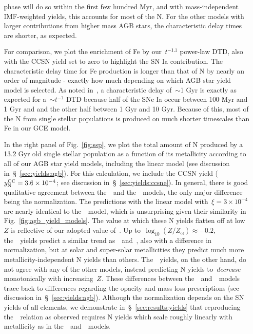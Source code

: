 \documentclass[ms.tex]{subfiles}
\begin{document}
phase will do so within the first few hundred Myr, and with mass-independent
IMF-weighted yields, this accounts for most of the N.
For the other models with larger contributions from higher mass AGB stars, the
characteristic delay times are shorter, as expected.
\par
For comparison, we plot the enrichment of Fe by our~$t^{-1.1}$ power-law DTD,
also with the CCSN yield set to zero to highlight the SN Ia contribution.
The characteristic delay time for Fe production is longer than that of N by
nearly an order of magnitude - exactly how much depending on which AGB star
yield model is selected.
As noted in~\citet{Johnson2021}, a characteristic delay of~$\sim$1 Gyr is
exactly as expected for a~$\sim t^{-1}$ DTD because half of the SNe Ia occur
between 100 Myr and 1 Gyr and and the other half between 1 Gyr and 10 Gyr.
Because of this, most of the N from single stellar populations is produced on
much shorter timescales than Fe in our GCE model.
\par
In the right panel of Fig.~\ref{fig:ssp}, we plot the total amount of N
produced by a 13.2 Gyr old single stellar population as a function of its
metallicity according to all of our AGB star yield models, including the linear
model (see discussion in~\S~\ref{sec:yields:agb}).
For this calculation, we include the CCSN yield ($y_\text{N}^\text{CC} = 3.6\times10^{-4}$;
see discussion in~\S~\ref{sec:yields:ccsne}).
In general, there is good qualitative agreement between the~\cristallo~and
the~\ventura~models, the only major difference being the normalization.
The predictions with the linear model with~$\xi = 3\times10^{-4}$ are nearly
identical to the~\cristallo~model, which is unsurprising given their
similarity in Fig.~\ref{fig:agb_yield_models}.
The value at which these N yields flatten off at low~$Z$ is reflective of our
adopted value of~.
Up to~$\log_{10}(Z / Z_\odot) \approx -0.2$, the~\karakas~yields predict a
similar trend as~\cristallo~and~\ventura, also with a difference in
normalization, but at solar and super-solar metallicities they predict much
more metallicity-independent N yields than others.
The~\karakasten~yields, on the other hand, do not agree with any of the other
models, instead predicting N yields to~\textit{decrease} monotonically with
increasing~$Z$.
These differences between the~\karakasten~and~\karakas~models trace back to
differences regarding the opacity and mass loss prescriptions (see discussion
in~\S~\ref{sec:yields:agb}).
Although the normalization depends on the SN yields of all elements, we
demonstrate in~\S~\ref{sec:results:yields} that reproducing the~\ohno~relation
as observed requires N yields which scale roughly linearly with metallicity as
in the~\cristallo~and~\ventura~models.
\end{document}
